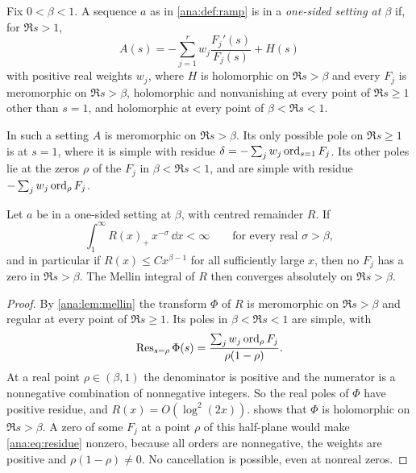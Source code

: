 \begin{definition}\label{ana:def:setting}
Fix $0<\beta<1$. A sequence $a$ as in \cref{ana:def:ramp} is in a \emph{one-sided setting at
$\beta$} if, for $\Re s>1$,
\begin{equation}\label{ana:eq:setting}
 A(s)=-\sum_{j=1}^{r}w_j\frac{F_j'(s)}{F_j(s)}+H(s)
\end{equation}
with positive real weights $w_j$, where $H$ is holomorphic on $\Re s>\beta$ and every $F_j$ is
meromorphic on $\Re s>\beta$, holomorphic and nonvanishing at every point of $\Re s\ge1$ other
than $s=1$, and holomorphic at every point of $\beta<\Re s<1$.
\end{definition}

In such a setting $A$ is meromorphic on $\Re s>\beta$. Its only possible pole on $\Re s\ge1$ is
at $s=1$, where it is simple with residue $\delta=-\sum_jw_j\operatorname{ord}_{s=1}F_j$. Its other poles lie
at the zeros $\rho$ of the $F_j$ in $\beta<\Re s<1$, and are simple with residue
$-\sum_jw_j\operatorname{ord}_\rho F_j$.

\begin{theorem}\label{ana:thm:zerotest}
Let $a$ be in a one-sided setting at $\beta$, with centred remainder $R$. If
\[
 \int_1^\infty R(x)_+\,x^{-\sigma}\,\dd x<\infty\qquad\text{for every real }\sigma>\beta,
\]
and in particular if $R(x)\le Cx^{\beta-1}$ for all sufficiently large $x$, then no $F_j$ has a
zero in $\Re s>\beta$. The Mellin integral of $R$ then converges absolutely on $\Re s>\beta$.
\end{theorem}

\begin{proof}
By \cref{ana:lem:mellin} the transform $\Phi$ of $R$ is meromorphic on $\Re s>\beta$ and regular
at every point of $\Re s\ge1$. Its poles in $\beta<\Re s<1$ are simple, with
\begin{equation}\label{ana:eq:residue}
 \operatorname{Res}_{s=\rho}\Phi(s)=\frac{\sum_jw_j\operatorname{ord}_\rho F_j}{\rho(1-\rho)} .
\end{equation}
At a real point $\rho\in(\beta,1)$ the denominator is positive and the numerator is a
nonnegative combination of nonnegative integers. So the real poles of $\Phi$ have positive
residue, and $R(x)=O(\log^2(2x))$.  shows that $\Phi$ is holomorphic on
$\Re s>\beta$. A zero of some $F_j$ at a point $\rho$ of this half-plane would make
\eqref{ana:eq:residue} nonzero, because all orders are nonnegative, the weights are positive
and $\rho(1-\rho)\ne0$. No cancellation is possible, even at nonreal zeros.
\end{proof}

